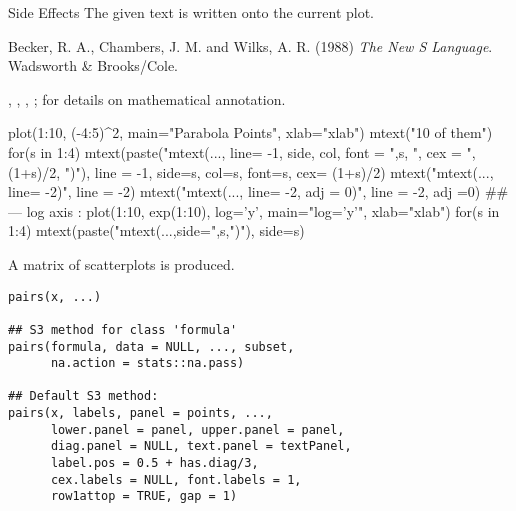 %
\begin{Section}{Side Effects}
The given text is written onto the current plot.
\end{Section}
%
\begin{References}\relax
Becker, R. A., Chambers, J. M. and Wilks, A. R. (1988)
\emph{The New S Language}.
Wadsworth \& Brooks/Cole.
\end{References}
%
\begin{SeeAlso}\relax
{}, , ,
;
 for details on mathematical annotation.
\end{SeeAlso}
%
\begin{Examples}
\begin{ExampleCode}
plot(1:10, (-4:5)^2, main="Parabola Points", xlab="xlab")
mtext("10 of them")
for(s in 1:4)
    mtext(paste("mtext(..., line= -1, {side, col, font} = ",s,
          ", cex = ", (1+s)/2, ")"), line = -1,
          side=s, col=s, font=s, cex= (1+s)/2)
mtext("mtext(..., line= -2)", line = -2)
mtext("mtext(..., line= -2, adj = 0)", line = -2, adj =0)
##--- log axis :
plot(1:10, exp(1:10), log='y', main="log='y'", xlab="xlab")
for(s in 1:4) mtext(paste("mtext(...,side=",s,")"), side=s)
\end{ExampleCode}
\end{Examples}
%
\begin{Description}\relax
A matrix of scatterplots is produced.
\end{Description}
%
\begin{Usage}
\begin{verbatim}
pairs(x, ...)

## S3 method for class 'formula'
pairs(formula, data = NULL, ..., subset,
      na.action = stats::na.pass)

## Default S3 method:
pairs(x, labels, panel = points, ...,
      lower.panel = panel, upper.panel = panel,
      diag.panel = NULL, text.panel = textPanel,
      label.pos = 0.5 + has.diag/3,
      cex.labels = NULL, font.labels = 1,
      row1attop = TRUE, gap = 1)
\end{verbatim}
\end{Usage}
%
